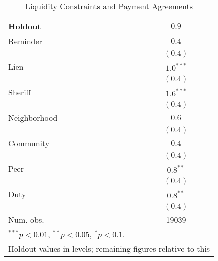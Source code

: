 \begin{table}[htbp]
\caption{Liquidity Constraints and Payment Agreements}\label{payment}
\begin{center}
\begin{tabular}{l c }
\hline
Holdout      & $0.9$ \\
\hline
Reminder     & $0.4$       \\
             & $(0.4)$     \\
Lien         & $1.0^{***}$ \\
             & $(0.4)$     \\
Sheriff      & $1.6^{***}$ \\
             & $(0.4)$     \\
Neighborhood & $0.6$       \\
             & $(0.4)$     \\
Community    & $0.4$       \\
             & $(0.4)$     \\
Peer         & $0.8^{**}$  \\
             & $(0.4)$     \\
Duty         & $0.8^{**}$  \\
             & $(0.4)$     \\
\hline
Num. obs.    & 19039       \\
\hline
\multicolumn{2}{l}{$^{***}p<0.01$, $^{**}p<0.05$, $^*p<0.1$. } \\
\multicolumn{2}{l}{Holdout values in levels; remaining figures relative to this}
\end{tabular}
\end{center}
\end{table}
